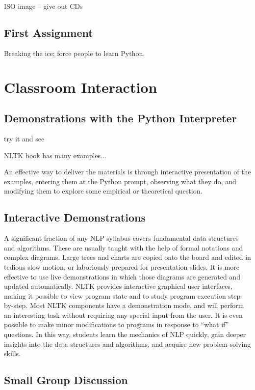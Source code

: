 \documentclass[11pt]{article}
\begin{document}
ISO image -- give out CDs

\subsection{First Assignment}

Breaking the ice; force people to learn Python.




\section{Classroom Interaction}
\label{sec:classroom-interaction}

\subsection{Demonstrations with the Python Interpreter}

try it and see

NLTK book has many examples...

An effective way to deliver the materials is through interactive
presentation of the examples, entering them at the Python prompt,
observing what they do, and modifying them to explore some empirical
or theoretical question.


\subsection{Interactive Demonstrations}

A significant fraction of any NLP syllabus covers fundamental data
structures and algorithms. These are usually taught with the help of
formal notations and complex diagrams. Large trees and charts are
copied onto the board and edited in tedious slow motion, or
laboriously prepared for presentation slides. It is more effective to
use live demonstrations in which those diagrams are generated and
updated automatically. NLTK provides interactive graphical user
interfaces, making it possible to view program state and to study
program execution step-by-step. Most NLTK components have a
demonstration mode, and will perform an interesting task without
requiring any special input from the user. It is even possible to make
minor modifications to programs in response to ``what if'' questions. In
this way, students learn the mechanics of NLP quickly, gain deeper
insights into the data structures and algorithms, and acquire new
problem-solving skills.

\subsection{Small Group Discussion}
\end{document}
